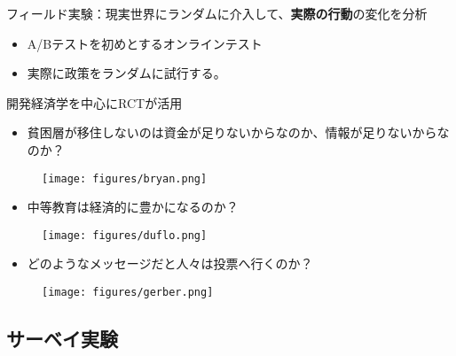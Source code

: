 \documentclass[
  xelatex,
  ja=standard]{bxjsarticle}
\providecommand{\tightlist}{%
  \setlength{\itemsep}{0pt}\setlength{\parskip}{0pt}}\usepackage{longtable,booktabs,array}
\begin{document}
フィールド実験：現実世界にランダムに介入して、\textbf{実際の行動}の変化を分析

\begin{itemize}
\tightlist
\item
  A/Bテストを初めとするオンラインテスト
\item
  実際に政策をランダムに試行する。
\end{itemize}

開発経済学を中心にRCTが活用\citep{banerjee2012, leigh2020}

\begin{itemize}
\tightlist
\item
  貧困層が移住しないのは資金が足りないからなのか、情報が足りないからなのか？\citep{bryan2014}
\end{itemize}

\begin{figure}[htpb]

{\centering \texttt{[image: figures/bryan.png]}

}

\caption{\citet{bryan2014}}

\end{figure}

\begin{itemize}
\tightlist
\item
  中等教育は経済的に豊かになるのか？\citep{duflo2021}
\end{itemize}

\begin{figure}[htpb]

{\centering \texttt{[image: figures/duflo.png]}

}

\caption{\citet{duflo2021}}

\end{figure}

\begin{itemize}
\tightlist
\item
  どのようなメッセージだと人々は投票へ行くのか？\citep{gerber2008}
\end{itemize}

\begin{figure}[htpb]

{\centering \texttt{[image: figures/gerber.png]}

}

\caption{\citet{gerber2008}}

\end{figure}

\hypertarget{ux30b5ux30fcux30d9ux30a4ux5b9fux9a13}{%
\subsection{サーベイ実験}\label{ux30b5ux30fcux30d9ux30a4ux5b9fux9a13}}
\end{document}
